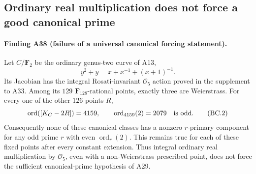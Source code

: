 \subsection{Ordinary real multiplication does not force a good canonical prime}

\paragraph{Finding A38 (failure of a universal canonical forcing statement).}
Let $C/\mathbf F_2$ be the ordinary genus-two curve of A13,
\[
                   y^2+y=x+x^{-1}+(x+1)^{-1}.
 \tag{BC.1}
\]
Its Jacobian has the integral Rosati-invariant $\mathcal O_5$
action proved in the supplement to A33. Among its $129$
$\mathbf F_{128}$-rational points, exactly three are Weierstrass.
For every one of the other $126$ points $R$,
\[
                  \operatorname{ord}([K_C-2R])=4159,
             \qquad \operatorname{ord}_{4159}(2)=2079
                       \quad\hbox{is odd}.
 \tag{BC.2}
\]
Consequently none of these canonical classes has a nonzero
$r$-primary component for any odd prime $r$ with even
$\operatorname{ord}_r(2)$. This remains true for each of these
fixed points after every constant extension. Thus integral
ordinary real multiplication by $\mathcal O_5$, even with a
non-Weierstrass prescribed point, does not force the sufficient
canonical-prime hypothesis of A29.

